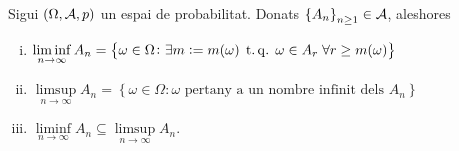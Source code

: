 \begin{prop}
  Sigui $\left(\Omega,\mathcal{A},p\right)$ un espai de probabilitat. Donats $\left\{ A_n\right\}_{n\geq1} \in \mathcal{A}$, aleshores
  \begin{enumerate}[i)]
   \item $\liminf\limits_{n\to\infty} A_n= \left\{\omega\in\Omega\colon \exists m:=m(\omega) \operatorname{\;t.q.\;} \omega\in A_r \;\forall r\geq m(\omega)\right\}$
   \item $\limsup\limits_{n\to\infty} A_n= \left\{\omega\in\Omega \colon \omega \text{ pertany a un nombre infinit dels } A_n\right\}$
   \item $\liminf\limits_{n\to\infty} A_n \subseteq \limsup\limits_{n\to\infty} A_n$.
  \end{enumerate}

\end{prop}


